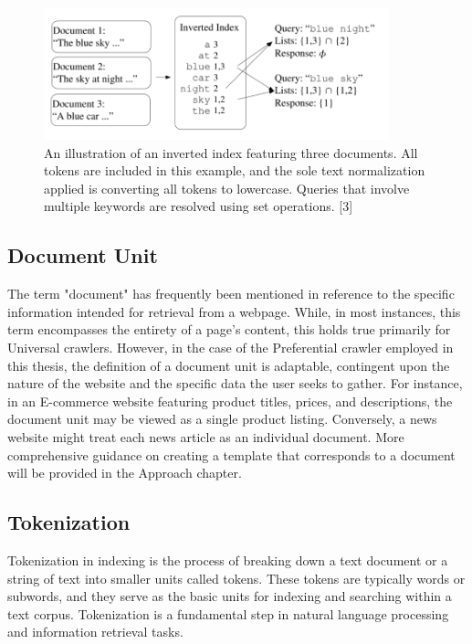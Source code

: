 \begin{figure}[h]	
     \centering
     \includegraphics[width=10cm]{images/inverted_index.png}
     \caption{
An illustration of an inverted index featuring three documents. All tokens are included in this example, and the sole text normalization applied is converting all tokens to lowercase. Queries that involve multiple keywords are resolved using set operations. [3]}
     \label{fig:google-arch}
\end{figure}

\subsection{Document Unit}
The term "document" has frequently been mentioned in reference to the specific information intended for retrieval from a webpage. While, in most instances, this term encompasses the entirety of a page's content, this holds true primarily for Universal crawlers. However, in the case of the Preferential crawler employed in this thesis, the definition of a document unit is adaptable, contingent upon the nature of the website and the specific data the user seeks to gather. For instance, in an E-commerce website featuring product titles, prices, and descriptions, the document unit may be viewed as a single product listing. Conversely, a news website might treat each news article as an individual document. More comprehensive guidance on creating a template that corresponds to a document will be provided in the Approach chapter.

\subsection{Tokenization}
Tokenization in indexing is the process of breaking down a text document or a string of text into smaller units called tokens. These tokens are typically words or subwords, and they serve as the basic units for indexing and searching within a text corpus. Tokenization is a fundamental step in natural language processing and information retrieval tasks.



